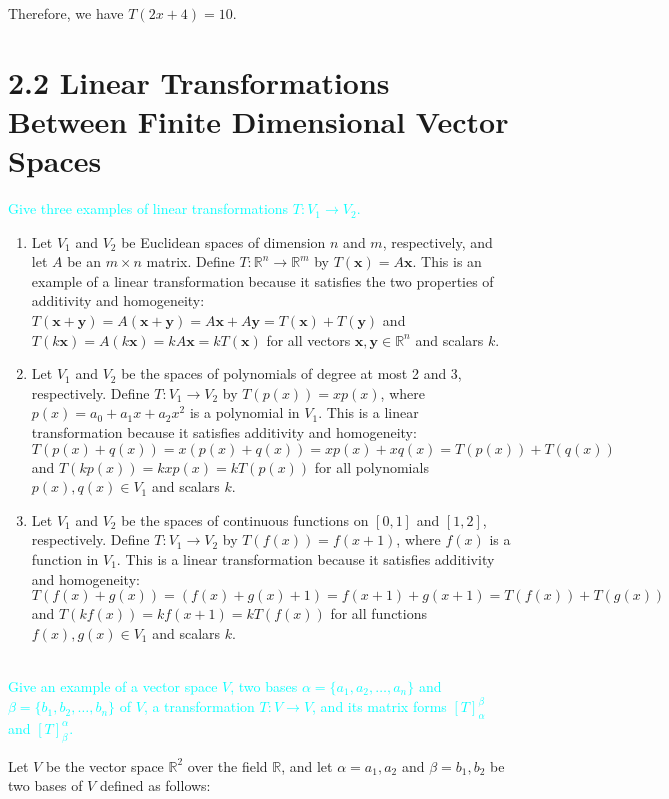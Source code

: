 \documentclass[fontsize=12pt]{scrartcl}
\begin{document}
Therefore, we have $T(2x+4) = 10$.

\section{2.2 Linear Transformations Between Finite Dimensional Vector Spaces}

\noindent
\textcolor{cyan}{Give three examples of linear transformations $T: V_1 \to V_2$.}

\begin{enumerate}
	\item Let $V_1$ and $V_2$ be Euclidean spaces of dimension $n$ and $m$, respectively, and let $A$ be an $m \times n$ matrix. Define $T:\mathbb{R}^n \to \mathbb{R}^m$ by $T(\mathbf{x})=A\mathbf{x}$. This is an example of a linear transformation because it satisfies the two properties of additivity and homogeneity: $T(\mathbf{x}+\mathbf{y}) = A(\mathbf{x}+\mathbf{y}) = A\mathbf{x} + A\mathbf{y} = T(\mathbf{x})+T(\mathbf{y})$ and $T(k\mathbf{x}) = A(k\mathbf{x}) = kA\mathbf{x} = kT(\mathbf{x})$ for all vectors $\mathbf{x}, \mathbf{y} \in \mathbb{R}^n$ and scalars $k$.
	\item Let $V_1$ and $V_2$ be the spaces of polynomials of degree at most 2 and 3, respectively. Define $T:V_1 \to V_2$ by $T(p(x)) = xp(x)$, where $p(x) = a_0 + a_1x + a_2x^2$ is a polynomial in $V_1$. This is a linear transformation because it satisfies additivity and homogeneity: $T(p(x) + q(x)) = x(p(x) + q(x)) = xp(x) + xq(x) = T(p(x)) + T(q(x))$ and $T(kp(x)) = kxp(x) = kT(p(x))$ for all polynomials $p(x), q(x) \in V_1$ and scalars $k$.
	\item Let $V_1$ and $V_2$ be the spaces of continuous functions on $[0,1]$ and $[1,2]$, respectively. Define $T:V_1 \to V_2$ by $T(f(x)) = f(x+1)$, where $f(x)$ is a function in $V_1$. This is a linear transformation because it satisfies additivity and homogeneity: $T(f(x) + g(x)) = (f(x) + g(x) + 1) = f(x+1) + g(x+1) = T(f(x)) + T(g(x))$ and $T(kf(x)) = kf(x+1) = kT(f(x))$ for all functions $f(x), g(x) \in V_1$ and scalars $k$.
\end{enumerate}
\\

\noindent
\textcolor{cyan}{Give an example of a vector space $V$, two bases $\alpha = \{ a_1, a_2, \ldots , a_n\}$ and $\beta = \{ b_1, b_2, \dots , b_n\}$ of $V$, a transformation $T: V\to V$, and its matrix forms $\left[T\right]_{\alpha}^{\beta}$ and $\left[T\right]_{\beta}^{\alpha}$.}

\noindent
Let $V$ be the vector space $\mathbb{R}^2$ over the field $\mathbb{R}$, and let $\alpha = {a_1, a_2}$ and $\beta = {b_1, b_2}$ be two bases of $V$ defined as follows:
\end{document}
